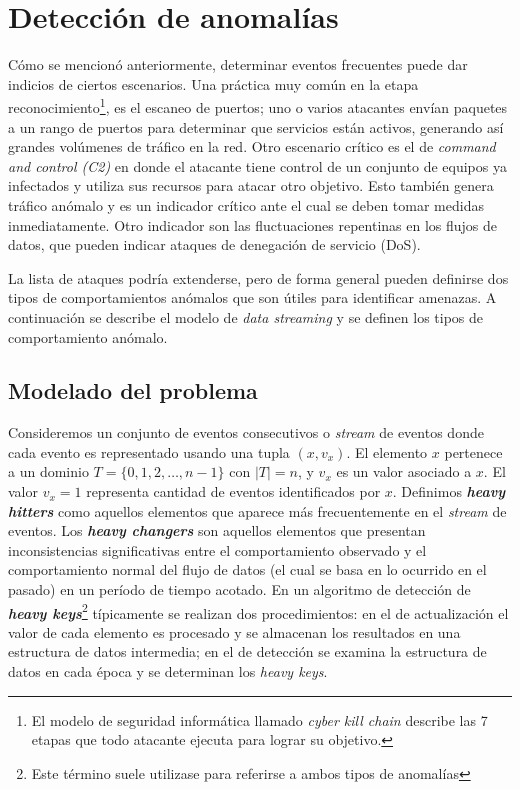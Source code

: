 \documentclass[a4paper,10pt, oneside]{article}
\begin{document}
\section{Detección de anomalías}
Cómo se mencionó anteriormente, determinar eventos frecuentes puede dar indicios de ciertos escenarios. Una práctica muy común en la etapa reconocimiento\footnote{El modelo de seguridad informática llamado \textit{cyber kill chain} describe las 7 etapas que todo atacante ejecuta para lograr su objetivo.\cite{hutchins2011intelligence}}, es el escaneo de puertos; uno o varios atacantes envían paquetes a un rango de puertos para determinar que servicios están activos, generando así grandes volúmenes de tráfico en la red. Otro escenario crítico es el de \textit{command and control (C2)} en donde el atacante tiene control de un conjunto de equipos ya infectados y utiliza sus recursos para atacar otro objetivo. Esto también genera tráfico anómalo y es un indicador crítico ante el cual se deben tomar medidas inmediatamente. Otro indicador son las fluctuaciones repentinas en los flujos de datos, que pueden indicar ataques de denegación de servicio (DoS).

La lista de ataques podría extenderse, pero de forma general pueden definirse dos tipos de comportamientos anómalos que son útiles para identificar amenazas. A continuación se describe el modelo de \textit{data streaming} y se definen los tipos de comportamiento anómalo.


\subsection{Modelado del problema}\label{modelado}

Consideremos un conjunto de eventos consecutivos o \textit{stream} de eventos donde cada evento es representado usando una tupla $(x, v_x)$. El elemento $x$ pertenece a un dominio $T=\{0,1,2, \dots, n-1\}$ con $|T|=n$, y $v_x$ es un valor asociado a $x$. El valor $v_x=1$ representa cantidad de eventos identificados por $x$. Definimos \textbf{\textit{heavy hitters}} como aquellos elementos que aparece más frecuentemente en el \textit{stream} de eventos. Los \textbf{\textit{heavy changers}} son aquellos elementos que presentan inconsistencias significativas entre el comportamiento observado y el comportamiento normal del flujo de datos (el cual se basa en lo ocurrido en el pasado) en un período de tiempo acotado\cite{Tong:2016:HTS:2927964.2927977}. 
En un algoritmo de detección de \textbf{\textit{heavy keys}}\footnote{Este término suele utilizase para referirse a ambos tipos de anomalías} típicamente se realizan dos procedimientos: en el de actualización el valor de cada elemento es procesado y se almacenan los resultados en una estructura de datos intermedia; en el de detección se examina la estructura de datos en cada época y se determinan los \textit{heavy keys}.
\end{document}
